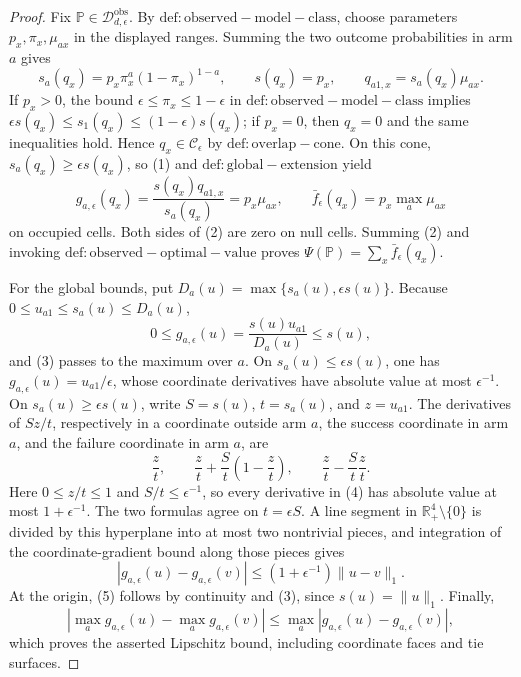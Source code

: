 \documentclass{article}
\begin{document}
\begin{proof}
Fix \(\mathbb P\in\mathcal D_{d,\epsilon}^{\mathrm{obs}}\).  By \(\mathrm{def:observed-model-class}\), choose parameters \(p_x,\pi_x,\mu_{ax}\) in the displayed ranges.  Summing the two outcome probabilities in arm \(a\) gives
\[
 s_a(q_x)=p_x\pi_x^a(1-\pi_x)^{1-a},\qquad s(q_x)=p_x,
 \qquad q_{a1,x}=s_a(q_x)\mu_{ax}.                                  \tag{1}
\]
If \(p_x>0\), the bound \(\epsilon\leq\pi_x\leq1-\epsilon\) in \(\mathrm{def:observed-model-class}\) implies
\(\epsilon s(q_x)\leq s_1(q_x)\leq(1-\epsilon)s(q_x)\); if \(p_x=0\), then \(q_x=0\) and the same inequalities hold.  Hence \(q_x\in\mathcal C_\epsilon\) by \(\mathrm{def:overlap-cone}\).  On this cone, \(s_a(q_x)\geq\epsilon s(q_x)\), so (1) and \(\mathrm{def:global-extension}\) yield
\[
 g_{a,\epsilon}(q_x)=\frac{s(q_x)q_{a1,x}}{s_a(q_x)}=p_x\mu_{ax},
 \qquad \bar f_\epsilon(q_x)=p_x\max_a\mu_{ax}                    \tag{2}
\]
on occupied cells.  Both sides of (2) are zero on null cells.  Summing (2) and invoking \(\mathrm{def:observed-optimal-value}\) proves \(\Psi(\mathbb P)=\sum_x\bar f_\epsilon(q_x)\).

For the global bounds, put \(D_a(u)=\max\{s_a(u),\epsilon s(u)\}\).  Because \(0\leq u_{a1}\leq s_a(u)\leq D_a(u)\),
\[
 0\leq g_{a,\epsilon}(u)=\frac{s(u)u_{a1}}{D_a(u)}\leq s(u),        \tag{3}
\]
and (3) passes to the maximum over \(a\).  On \(s_a(u)\leq\epsilon s(u)\), one has \(g_{a,\epsilon}(u)=u_{a1}/\epsilon\), whose coordinate derivatives have absolute value at most \(\epsilon^{-1}\).  On \(s_a(u)\geq\epsilon s(u)\), write \(S=s(u)\), \(t=s_a(u)\), and \(z=u_{a1}\).  The derivatives of \(Sz/t\), respectively in a coordinate outside arm \(a\), the success coordinate in arm \(a\), and the failure coordinate in arm \(a\), are
\[
 \frac zt,\qquad \frac zt+\frac St\left(1-\frac zt\right),
 \qquad \frac zt-\frac St\frac zt.                                \tag{4}
\]
Here \(0\leq z/t\leq1\) and \(S/t\leq\epsilon^{-1}\), so every derivative in (4) has absolute value at most \(1+\epsilon^{-1}\).  The two formulas agree on \(t=\epsilon S\).  A line segment in \(\mathbb R_+^4\setminus\{0\}\) is divided by this hyperplane into at most two nontrivial pieces, and integration of the coordinate-gradient bound along those pieces gives
\[
 |g_{a,\epsilon}(u)-g_{a,\epsilon}(v)|
 \leq(1+\epsilon^{-1})\lVert u-v\rVert_1.                           \tag{5}
\]
At the origin, (5) follows by continuity and (3), since \(s(u)=\lVert u\rVert_1\).  Finally,
\[
 |\max_a g_{a,\epsilon}(u)-\max_a g_{a,\epsilon}(v)|
 \leq\max_a|g_{a,\epsilon}(u)-g_{a,\epsilon}(v)|,
\]
which proves the asserted Lipschitz bound, including coordinate faces and tie surfaces.


\end{proof}
\end{document}
